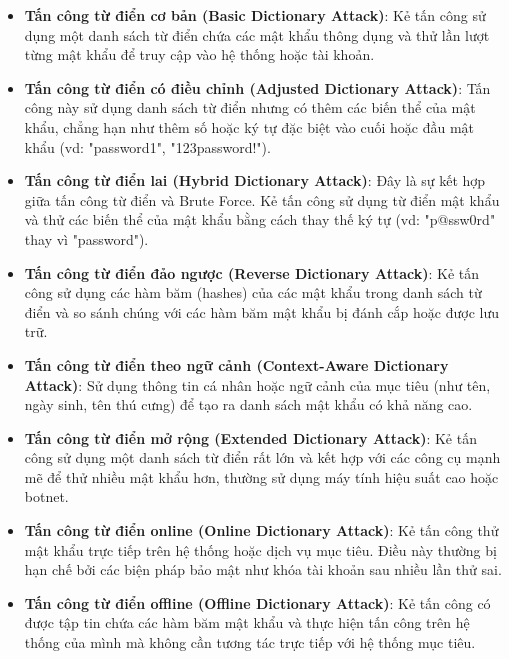 \begin{itemize}
    \item \textbf{Tấn công từ điển cơ bản (Basic Dictionary Attack)}: Kẻ tấn công sử dụng một danh sách từ điển chứa các mật khẩu thông dụng và thử lần lượt từng mật khẩu để truy cập vào hệ thống hoặc tài khoản.
    \item \textbf{Tấn công từ điển có điều chỉnh (Adjusted Dictionary Attack)}: Tấn công này sử dụng danh sách từ điển nhưng có thêm các biến thể của mật khẩu, chẳng hạn như thêm số hoặc ký tự đặc biệt vào cuối hoặc đầu mật khẩu (vd: "password1", "123password!").
    \item \textbf{Tấn công từ điển lai (Hybrid Dictionary Attack)}: Đây là sự kết hợp giữa tấn công từ điển và Brute Force. Kẻ tấn công sử dụng từ điển mật khẩu và thử các biến thể của mật khẩu bằng cách thay thế ký tự (vd: "p@ssw0rd" thay vì "password").
    \item \textbf{Tấn công từ điển đảo ngược (Reverse Dictionary Attack)}: Kẻ tấn công sử dụng các hàm băm (hashes) của các mật khẩu trong danh sách từ điển và so sánh chúng với các hàm băm mật khẩu bị đánh cắp hoặc được lưu trữ.
    \item \textbf{Tấn công từ điển theo ngữ cảnh (Context-Aware Dictionary Attack)}: Sử dụng thông tin cá nhân hoặc ngữ cảnh của mục tiêu (như tên, ngày sinh, tên thú cưng) để tạo ra danh sách mật khẩu có khả năng cao.
    \item \textbf{Tấn công từ điển mở rộng (Extended Dictionary Attack)}: Kẻ tấn công sử dụng một danh sách từ điển rất lớn và kết hợp với các công cụ mạnh mẽ để thử nhiều mật khẩu hơn, thường sử dụng máy tính hiệu suất cao hoặc botnet.
    \item \textbf{Tấn công từ điển online (Online Dictionary Attack)}: Kẻ tấn công thử mật khẩu trực tiếp trên hệ thống hoặc dịch vụ mục tiêu. Điều này thường bị hạn chế bởi các biện pháp bảo mật như khóa tài khoản sau nhiều lần thử sai.
    \item \textbf{Tấn công từ điển offline (Offline Dictionary Attack)}: Kẻ tấn công có được tập tin chứa các hàm băm mật khẩu và thực hiện tấn công trên hệ thống của mình mà không cần tương tác trực tiếp với hệ thống mục tiêu.
\end{itemize}
